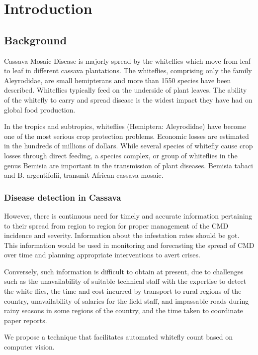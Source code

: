 \chapter{Introduction}

\section{Background}
Cassava Mosaic Disease is majorly spread by the whiteflies which move from leaf to leaf in different cassava plantations. The whiteflies, comprising only the family Aleyrodidae, are small hemipterans and more than 1550 species have been described. Whiteflies typically feed on the underside of plant leaves. The ability of the whitefly to carry and spread disease is the widest impact they have had on global food production. 

In the tropics and subtropics, whiteflies (Hemiptera: Aleyrodidae) have become one of the most serious crop protection problems. Economic losses are estimated in the hundreds of millions of dollars. While several species of whitefly cause crop losses through direct feeding, a species complex, or group of whiteflies in the genus Bemisia are important in the transmission of plant diseases. Bemisia tabaci and B. argentifolii, transmit African cassava mosaic.

\subsection{Disease detection in Cassava}

However, there is continuous need for timely and accurate information pertaining to their spread from region to region for proper management of the CMD incidence and severity. Information about the infestation rates should be got. This information would be used in monitoring and forecasting the spread of CMD over time and planning appropriate interventions to avert crises. 

Conversely, such information is difficult to obtain at present, due to challenges such as the unavailability of suitable technical staff with the expertise to detect the white flies, the time and cost incurred by transport to rural regions of the country, unavailability of salaries for the field staff, and impassable roads during rainy seasons in some regions of the country, and the time taken to coordinate paper reports.

We propose a technique that facilitates automated whitefly count based on computer vision.

